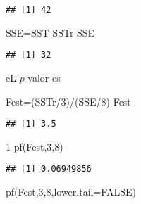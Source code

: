 \documentclass[
]{article}
\newenvironment{Shaded}{\begin{snugshade}}{\end{snugshade}}
\newcommand{\AttributeTok}[1]{\textcolor[rgb]{0.77,0.63,0.00}{#1}}
\newcommand{\ConstantTok}[1]{\textcolor[rgb]{0.00,0.00,0.00}{#1}}
\newcommand{\DecValTok}[1]{\textcolor[rgb]{0.00,0.00,0.81}{#1}}
\newcommand{\FunctionTok}[1]{\textcolor[rgb]{0.00,0.00,0.00}{#1}}
\newcommand{\NormalTok}[1]{#1}
\newcommand{\OtherTok}[1]{\textcolor[rgb]{0.56,0.35,0.01}{#1}}
\newcommand{\SpecialCharTok}[1]{\textcolor[rgb]{0.00,0.00,0.00}{#1}}
\begin{document}
\begin{Shaded}
\end{Shaded}

\begin{verbatim}
## [1] 42
\end{verbatim}

\begin{Shaded}
\begin{Highlighting}[]
\NormalTok{SSE}\OtherTok{=}\NormalTok{SST}\SpecialCharTok{{-}}\NormalTok{SSTr}
\NormalTok{SSE}
\end{Highlighting}
\end{Shaded}

\begin{verbatim}
## [1] 32
\end{verbatim}

eL \(p\)-valor es

\begin{Shaded}
\begin{Highlighting}[]
\NormalTok{Fest}\OtherTok{=}\NormalTok{(SSTr}\SpecialCharTok{/}\DecValTok{3}\NormalTok{)}\SpecialCharTok{/}\NormalTok{(SSE}\SpecialCharTok{/}\DecValTok{8}\NormalTok{)}
\NormalTok{Fest}
\end{Highlighting}
\end{Shaded}

\begin{verbatim}
## [1] 3.5
\end{verbatim}

\begin{Shaded}
\begin{Highlighting}[]
\DecValTok{1}\SpecialCharTok{{-}}\FunctionTok{pf}\NormalTok{(Fest,}\DecValTok{3}\NormalTok{,}\DecValTok{8}\NormalTok{)}
\end{Highlighting}
\end{Shaded}

\begin{verbatim}
## [1] 0.06949856
\end{verbatim}

\begin{Shaded}
\begin{Highlighting}[]
\FunctionTok{pf}\NormalTok{(Fest,}\DecValTok{3}\NormalTok{,}\DecValTok{8}\NormalTok{,}\AttributeTok{lower.tail=}\ConstantTok{FALSE}\NormalTok{)}
\end{Highlighting}
\end{Shaded}
\end{document}
